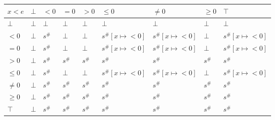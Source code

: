 \documentclass{article}
\begin{document}
            \begin{table}
                \begin{tabular}{|l|l|l|l|l|l|l|l|l|}
                \hline
                $x < e$ & $\bot$ & $<0$   & $=0$   & $>0$   & $\le 0$              & $\ne 0$              & $\ge 0$ & $\top$               \\ \hline
                $\bot$  & $\bot$ & $\bot$ & $\bot$ & $\bot$ & $\bot$               & $\bot$               & $\bot$  & $\bot$               \\ \hline
                $<0$    & $\bot$ & $s^\#$ & $\bot$ & $\bot$ & $s^\#[x \mapsto <0]$ & $s^\#[x \mapsto <0]$ & $\bot$  & $s^\#[x \mapsto <0]$ \\ \hline
                $=0$    & $\bot$ & $s^\#$ & $\bot$ & $\bot$ & $s^\#[x \mapsto <0]$ & $s^\#[x \mapsto <0]$ & $\bot$  & $s^\#[x \mapsto <0]$ \\ \hline
                $>0$    & $\bot$ & $s^\#$ & $s^\#$ & $s^\#$ & $s^\#$               & $s^\#$               & $s^\#$  & $s^\#$               \\ \hline
                $\le 0$ & $\bot$ & $s^\#$ & $\bot$ & $\bot$ & $s^\#[x \mapsto <0]$ & $s^\#[x \mapsto <0]$ & $\bot$  & $s^\#[x \mapsto <0]$ \\ \hline
                $\ne 0$ & $\bot$ & $s^\#$ & $s^\#$ & $s^\#$ & $s^\#$               & $s^\#$               & $s^\#$  & $s^\#$               \\ \hline
                $\ge 0$ & $\bot$ & $s^\#$ & $s^\#$ & $s^\#$ & $s^\#$               & $s^\#$               & $s^\#$  & $s^\#$               \\ \hline
                $\top$  & $\bot$ & $s^\#$ & $s^\#$ & $s^\#$ & $s^\#$               & $s^\#$               & $s^\#$  & $s^\#$               \\ \hline
                \end{tabular}
                \end{table}
\end{document}
